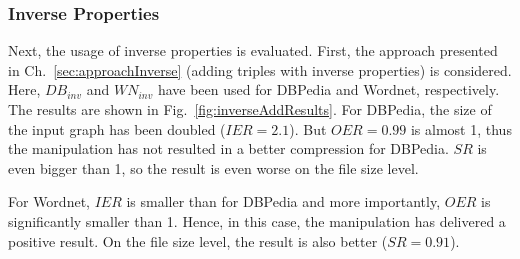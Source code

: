 \clearpage
\subsubsection{Inverse Properties}

Next, the usage of inverse properties is evaluated. First, the approach presented in Ch.~\ref{sec:approachInverse} (adding triples with inverse properties) is considered. Here, $DB_{inv}$ and $WN_{inv}$ have been used for DBPedia and Wordnet, respectively. The results are shown in Fig.~\ref{fig:inverseAddResults}. For DBPedia, the size of the input graph has been doubled ($IER=2.1$). But $OER=0.99$ is almost 1, thus the manipulation has not resulted in a better compression for DBPedia. $SR$ is even bigger than 1, so the result is even worse on the file size level.

For Wordnet, $IER$ is smaller than for DBPedia and more importantly, $OER$ is significantly smaller than 1. Hence, in this case, the manipulation has delivered a positive result. On the file size level, the result is also better ($SR=0.91$).


